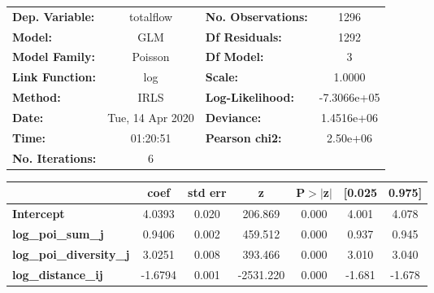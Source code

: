 \begin{center}
\begin{tabular}{lclc}
\toprule
\textbf{Dep. Variable:}         &    totalflow     & \textbf{  No. Observations:  } &      1296    \\
\textbf{Model:}                 &       GLM        & \textbf{  Df Residuals:      } &      1292    \\
\textbf{Model Family:}          &     Poisson      & \textbf{  Df Model:          } &         3    \\
\textbf{Link Function:}         &       log        & \textbf{  Scale:             } &     1.0000   \\
\textbf{Method:}                &       IRLS       & \textbf{  Log-Likelihood:    } & -7.3066e+05  \\
\textbf{Date:}                  & Tue, 14 Apr 2020 & \textbf{  Deviance:          } &  1.4516e+06  \\
\textbf{Time:}                  &     01:20:51     & \textbf{  Pearson chi2:      } &   2.50e+06   \\
\textbf{No. Iterations:}        &        6         & \textbf{                     } &              \\
\bottomrule
\end{tabular}
\begin{tabular}{lcccccc}
                                & \textbf{coef} & \textbf{std err} & \textbf{z} & \textbf{P$> |$z$|$} & \textbf{[0.025} & \textbf{0.975]}  \\
\midrule
\textbf{Intercept}              &       4.0393  &        0.020     &   206.869  &         0.000        &        4.001    &        4.078     \\
\textbf{log\_poi\_sum\_j}       &       0.9406  &        0.002     &   459.512  &         0.000        &        0.937    &        0.945     \\
\textbf{log\_poi\_diversity\_j} &       3.0251  &        0.008     &   393.466  &         0.000        &        3.010    &        3.040     \\
\textbf{log\_distance\_ij}      &      -1.6794  &        0.001     & -2531.220  &         0.000        &       -1.681    &       -1.678     \\
\bottomrule
\end{tabular}
\end{center}